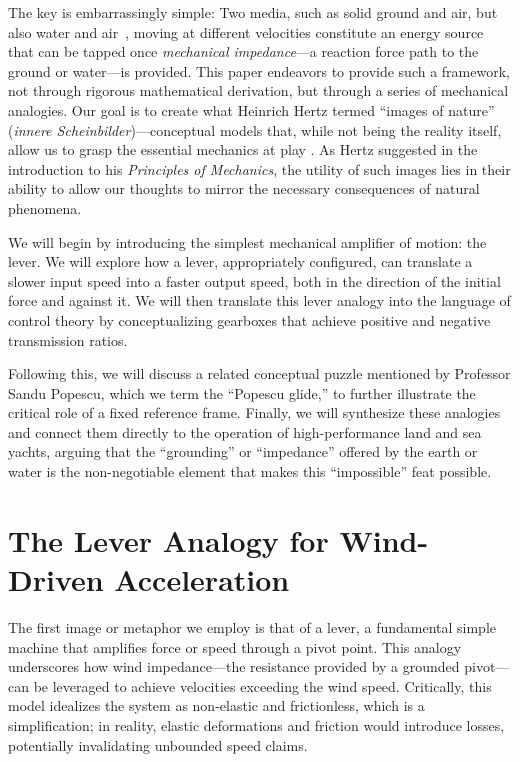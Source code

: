 \documentclass[reprint,aps,pra,superscriptaddress,longbibliography]{revtex4-2}
\begin{document}
The key is embarrassingly simple: Two media, such as solid ground and air, but also water and air~\cite{Blackford1978}, moving at different velocities constitute an energy source that can be tapped once \emph{mechanical impedance}---a reaction force path to the ground or water---is provided.
This paper endeavors to provide such a framework, not through rigorous mathematical derivation, but through a series of mechanical analogies. Our goal is to create what Heinrich Hertz termed ``images of nature'' (\textit{innere Scheinbilder})---conceptual models that, while not being the reality itself, allow us to grasp the essential mechanics at play \cite{hertz-94e}. As Hertz suggested in the introduction to his \textit{Principles of Mechanics}, the utility of such images lies in their ability to allow our thoughts to mirror the necessary consequences of natural phenomena.

We will begin by introducing the simplest mechanical amplifier of motion: the lever. We will explore how a lever, appropriately configured, can translate a slower input speed into a faster output speed, both in the direction of the initial force and against it. We will then translate this lever analogy into the language of control theory by conceptualizing gearboxes that achieve positive and negative transmission ratios.

Following this, we will discuss a related conceptual puzzle mentioned by Professor Sandu Popescu, which we term the ``Popescu glide,'' to further illustrate the critical role of a fixed reference frame. Finally, we will synthesize these analogies and connect them directly to the operation of high-performance land and sea yachts, arguing that the ``grounding'' or ``impedance'' offered by the earth or water is the non-negotiable element that makes this ``impossible'' feat possible.

\section{The Lever Analogy for Wind-Driven Acceleration}

The first image or metaphor we employ is that of a lever, a fundamental simple machine that amplifies force or speed through a pivot point. This analogy underscores how wind impedance---the resistance provided by a grounded pivot---can be leveraged to achieve velocities exceeding the wind speed. Critically, this model idealizes the system as non-elastic and frictionless, which is a simplification; in reality, elastic deformations and friction would introduce losses, potentially invalidating unbounded speed claims.
\end{document}
